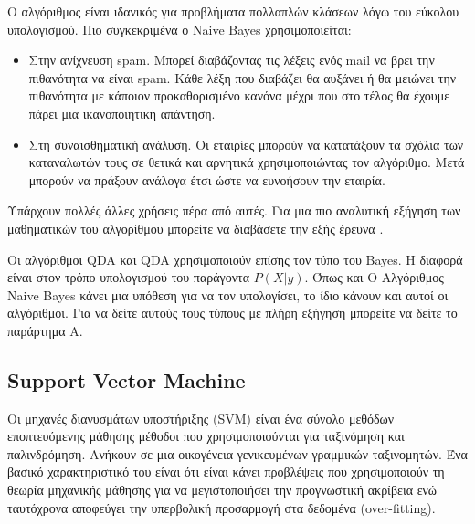Ο αλγόριθμος είναι ιδανικός για προβλήματα πολλαπλών κλάσεων λόγω του εύκολου υπολογισμού.
Πιο συγκεκριμένα ο \textlatin{Naive Bayes} χρησιμοποιείται:
\begin{itemize}
    \item Στην ανίχνευση \textlatin{spam}. Μπορεί διαβάζοντας τις λέξεις ενός
    \textlatin{mail} να βρει την πιθανότητα να είναι \textlatin{spam}. Κάθε λέξη που διαβάζει
    θα αυξάνει ή θα μειώνει την πιθανότητα με κάποιον προκαθορισμένο κανόνα μέχρι που στο
    τέλος θα έχουμε πάρει μια ικανοποιητική απάντηση.
    \item Στη συναισθηματική ανάλυση. Οι εταιρίες μπορούν να κατατάξουν τα σχόλια των
    καταναλωτών τους σε θετικά και αρνητικά χρησιμοποιώντας τον αλγόριθμο. Μετά μπορούν
    να πράξουν ανάλογα έτσι ώστε να ευνοήσουν την εταιρία.
\end{itemize}

Υπάρχουν πολλές άλλες χρήσεις πέρα από αυτές. Για μια πιο αναλυτική εξήγηση των μαθηματικών
του αλγορίθμου μπορείτε να διαβάσετε την εξής έρευνα \cite{rish2001empirical}.

Οι αλγόριθμοι \textlatin{QDA} και \textlatin{QDA} χρησιμοποιούν επίσης τον τύπο του
\textlatin{Bayes}. Η διαφορά είναι στον τρόπο υπολογισμού του παράγοντα $P(X|y)$. Όπως και Ο
Αλγόριθμος \textlatin{Naive Bayes} κάνει μια υπόθεση για να τον υπολογίσει, το ίδιο κάνουν και
αυτοί οι αλγόριθμοι. Για να δείτε αυτούς τους τύπους με πλήρη εξήγηση μπορείτε να δείτε το
παράρτημα Α.

\subsection{\textlatin{Support Vector Machine}}
Οι μηχανές διανυσμάτων υποστήριξης (\textlatin{SVM}) είναι ένα σύνολο μεθόδων εποπτευόμενης
μάθησης
μέθοδοι που χρησιμοποιούνται για ταξινόμηση και παλινδρόμηση. Ανήκουν σε μια οικογένεια
γενικευμένων γραμμικών ταξινομητών. Ένα βασικό χαρακτηριστικό του είναι ότι είναι κάνει
προβλέψεις που χρησιμοποιούν τη θεωρία μηχανικής μάθησης για να μεγιστοποιήσει την
προγνωστική ακρίβεια ενώ ταυτόχρονα αποφεύγει την υπερβολική προσαρμογή στα δεδομένα
(\textlatin{over-fitting})\cite{jakkula2006tutorial}.

